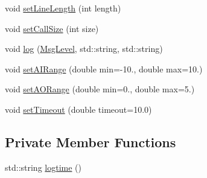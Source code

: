 \begin{DoxyCompactItemize}
\item 
void \hyperlink{classServer__NI6008_adc52659db137940242998e8e0b980c03}{setLineLength} (int length)
\item 
void \hyperlink{classServer__NI6008_ae2eab1871efb0ec0a7c0c72f56604e13}{setCallSize} (int size)
\item 
void \hyperlink{classServer__NI6008_ab83d0f144d5bb34f3a22aabef37de440}{log} (\hyperlink{classServer__NI6008_af1e3e3bac26355a746b5d2e548fe25be}{MsgLevel}, std::string, std::string)
\item 
void \hyperlink{classServer__NI6008_a120ec56f6af12d56683322f56a8d7878}{setAIRange} (double min=-\/10., double max=10.)
\item 
void \hyperlink{classServer__NI6008_aec1596005b4c75cc2c13d87ab3d9d120}{setAORange} (double min=0., double max=5.)
\item 
void \hyperlink{classServer__NI6008_ade018df1c5afac06e6d528536635ba48}{setTimeout} (double timeout=10.0)
\end{DoxyCompactItemize}
\subsection*{Private Member Functions}
\begin{DoxyCompactItemize}
\item 
std::string \hyperlink{classServer__NI6008_aab6f8e71661f6234a72d539dedbd53d2}{logtime} ()
\end{DoxyCompactItemize}
